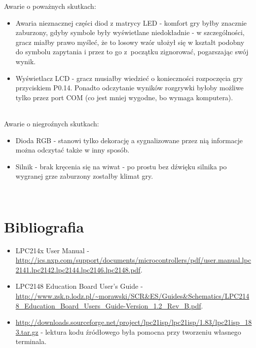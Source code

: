 \documentclass[a4paper, portrait,11pt]{article}
\begin{document}
Awarie o poważnych skutkach:
\begin{itemize}
\item Awaria nieznacznej części diod z matrycy LED - komfort
gry byłby znacznie zaburzony, gdyby symbole były wyświetlane
niedokładnie - w szczególności, gracz miałby prawo myśleć,
że to losowy wzór ułożył się w kształt podobny do symbolu
zapytania i przez to go z~początku zignorować, pogarszając
swój wynik.
\item Wyświetlacz LCD - gracz musiałby wiedzieć o konieczności
rozpoczęcia gry przyciskiem P0.14. Ponadto odczytanie wyników
rozgrywki byłoby możliwe tylko przez port COM (co jest mniej
wygodne, bo wymaga komputera).
\end{itemize}\ \\

Awarie o niegroźnych skutkach:
\begin{itemize}
\item Dioda RGB - stanowi tylko dekorację a sygnalizowane przez
nią informacje można odczytać także w inny sposób.
\item Silnik - brak kręcenia się na wiwat - po prostu bez
dźwięku silnika po wygranej grze zaburzony zostałby klimat
gry.
\end{itemize}\ \\

\section*{Bibliografia}
\begin{itemize}
\item LPC214x User Manual - \url{http://ics.nxp.com/support/documents/microcontrollers/pdf/user.manual.lpc2141.lpc2142.lpc2144.lpc2146.lpc2148.pdf}.
\item LPC2148 Education Board User's Guide - \url{http://www.zsk.p.lodz.pl/~morawski/SCR&ES/Guides&Schematics/LPC2148_Education_Board_Users_Guide-Version_1.2_Rev_B.pdf}.
\item \url{http://downloads.sourceforge.net/project/lpc21isp/lpc21isp/1.83/lpc21isp_183.tar.gz} - lektura kodu źródłowego była pomocna przy tworzeniu własnego terminala.
\end{itemize}
\end{document}
